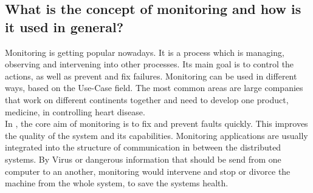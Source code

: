 \subsection{What is the concept of monitoring and how is it used in general?}
\label{subsec:ConceptMonitoring}

Monitoring is getting popular nowadays. It is a process which is managing, observing and intervening into other processes. Its main goal is to control the actions, as well as prevent and fix failures. Monitoring can be used in different ways, based on the Use-Case field. The most common areas are large companies that work on different continents together and need to develop one product, medicine, in controlling heart disease.
\\
 In \isds, the core aim of monitoring is to fix and prevent faults quickly. This improves the quality of the system and its capabilities. Monitoring applications are usually integrated into the structure of communication in between the distributed systems. By Virus or dangerous information that should be send from one computer to an another, monitoring would intervene and stop or divorce the machine from the whole system, to save the systems health. 
 
